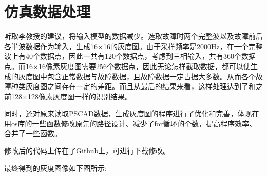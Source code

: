 \documentclass{article}
\begin{document}
	\section{仿真数据处理}
	
	听取李教授的建议，将输入模型的数据减少。选取故障时两个完整波以及故障前后各半波数据作为输入，生成16$\times$16的灰度图。由于采样频率是2000Hz，在一个完整波上有40个数据点，因此一共有120个数据点，考虑到三相输入，共有360个数据点。而16$\times$16像素灰度图需要256个数据点，因此无论怎样截取数据，都可以使生成的灰度图中包含正常数据与故障数据，且故障数据一定占据大多数。从而各个故障种类灰度图之间存在一定的差距。而且从最后的结果来看，这样处理达到了和之前128$\times$128像素灰度图一样的识别结果。
	
	同时，还对原来读取PSCAD数据，生成灰度图的程序进行了优化和完善，体现在用os库的一些函数修改原先的路径设计、减少了for循环的个数，提高程序效率、合并了一些函数。
	
	修改后的代码上传在了Github上，可进行下载修改。
	
	最终得到的灰度图像如下图所示:
	
\end{document}
